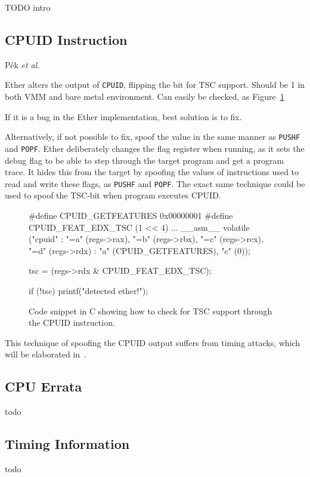 TODO intro


\subsection{CPUID Instruction}
\label{sec:approach-cpuid}


P{\'e}k {\em et al.}~\cite{nether}

Ether alters the output of {\tt CPUID}, flipping the bit for TSC support. Should
be 1 in both VMM and bare metal environment. Can easily be checked, as
Figure~\ref{fig:cpuid-tsc}

If it is a bug in the Ether implementation, best solution is to fix.

Alternatively, if not possible to fix, spoof the value in the same manner as
{\tt PUSHF} and {\tt POPF}. Ether deliberately changes the flag register when
running, as it sets the debug flag to be able to step through the target program
and get a program trace. It hides this from the target by spoofing the values of
instructions used to read and write these flags, as {\tt PUSHF} and {\tt POPF}.
The exact same technique could be used to spoof the TSC-bit when program
executes CPUID.

\begin{figure}[h]
\begin{lstc}
#define CPUID_GETFEATURES 0x00000001
#define CPUID_FEAT_EDX_TSC (1 << 4)
...
__asm__ volatile ("cpuid" :
    "=a" (regs->rax),
    "=b" (regs->rbx),
    "=c" (regs->rcx),
    "=d" (regs->rdx)
    : "a" (CPUID_GETFEATURES), "c" (0));

tsc  = (regs->rdx & CPUID_FEAT_EDX_TSC);

if (!tsc) printf("detected ether!\n");
\end{lstc}
\caption{\label{fig:cpuid-tsc} Code snippet in C showing how to check for TSC
  support through the CPUID instruction.}
\end{figure}

This technique of spoofing the CPUID output suffers from timing attacks, which
will be elaborated in~.


\subsection{CPU Errata}
\label{sec:approach-errata}

todo


\subsection{Timing Information}
\label{sec:approach-timing}

todo



